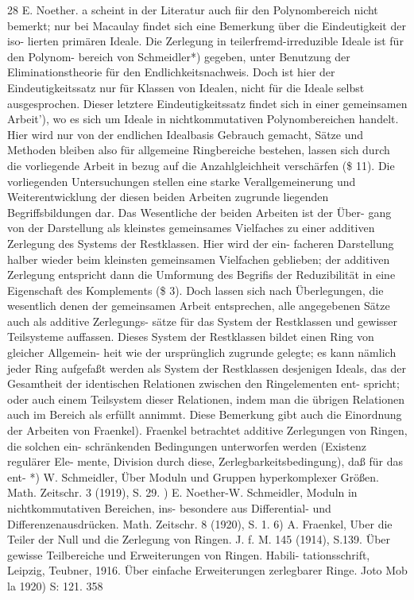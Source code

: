 \documentclass[11pt,a4paper]{article}
\theoremstyle{plain}
\theoremstyle{definition}
\begin{document}
28 
E. Noether. 
a 
scheint in der Literatur auch fiir den Polynombereich nicht bemerkt; nur 
bei Macaulay findet sich eine Bemerkung über die Eindeutigkeit der iso- 
lierten primären Ideale. 
Die Zerlegung in teilerfremd-irreduzible Ideale ist für den Polynom- 
bereich von Schmeidler*) gegeben, unter Benutzung der Eliminationstheorie 
für den Endlichkeitsnachweis. 
Doch 
ist hier der Eindeutigkeitssatz nur 
für Klassen von Idealen, nicht für die Ideale selbst ausgesprochen. 
Dieser 
letztere Eindeutigkeitssatz findet sich in einer gemeinsamen Arbeit'), wo es 
sich um Ideale in nichtkommutativen Polynombereichen handelt. 
Hier wird 
nur von der endlichen Idealbasis Gebrauch gemacht, Sätze und Methoden 
bleiben also für allgemeine Ringbereiche bestehen, 
lassen sich durch die 
vorliegende Arbeit in bezug auf die Anzahlgleichheit verschärfen (\$ 11). 
Die vorliegenden Untersuchungen 
stellen 
eine starke Verallgemeinerung 
und Weiterentwicklung 
der diesen 
beiden Arbeiten 
zugrunde liegenden 
Begriffsbildungen dar. Das Wesentliche der beiden Arbeiten ist der Über- 
gang von der Darstellung 
als kleinstes gemeinsames Vielfaches zu einer 
additiven Zerlegung 
des Systems 
der Restklassen. 
Hier wird 
der ein- 
facheren Darstellung halber wieder beim kleinsten gemeinsamen Vielfachen 
geblieben; 
der additiven Zerlegung entspricht dann die Umformung des 
Begrifis der Reduzibilität 
in eine Eigenschaft des Komplements (\$ 3). 
Doch lassen sich nach Überlegungen, die wesentlich denen der gemeinsamen 
Arbeit entsprechen, 
alle angegebenen Sätze auch als additive Zerlegungs- 
sätze für das System der Restklassen und gewisser Teilsysteme auffassen. 
Dieses System der Restklassen bildet einen Ring von gleicher Allgemein- 
heit wie der ursprünglich zugrunde gelegte; 
es kann nämlich jeder Ring 
aufgefaßt werden 
als System der Restklassen desjenigen Ideals, das der 
Gesamtheit der identischen Relationen zwischen den Ringelementen ent- 
spricht; 
oder auch einem Teilsystem dieser Relationen, 
indem man die 
übrigen Relationen auch im Bereich als erfüllt annimmt. 
Diese Bemerkung gibt auch die Einordnung der Arbeiten von Fraenkel). 
Fraenkel 
betrachtet additive Zerlegungen von Ringen, 
die solchen 
ein- 
schränkenden Bedingungen unterworfen werden 
(Existenz regulärer Ele- 
mente, Division durch diese, Zerlegbarkeitsbedingung), 
daß für das ent- 
*) W. Schmeidler, Über Moduln und Gruppen hyperkomplexer Größen. 
Math. 
Zeitschr. 3 (1919), S. 29. 
\textdegree{}) E. Noether-W. Schmeidler, Moduln 
in nichtkommutativen 
Bereichen, 
ins- 
besondere aus Differential- und Differenzenausdrücken. 
Math. Zeitschr. 8 (1920), S. 1. 
6) A. Fraenkel, Uber die Teiler der Null und die Zerlegung von Ringen. 
J. f. M. 
145 (1914), S.139. Über gewisse Teilbereiche und Erweiterungen von Ringen. 
Habili- 
tationsschrift, Leipzig, Teubner, 1916. 
Über einfache Erweiterungen zerlegbarer Ringe. 
Joto Mob la 1920) S: 121. 
358
\end{document}

